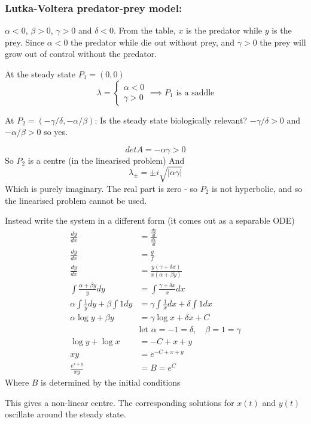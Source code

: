 \documentclass{X:/Documents/Coding/Latex/myassignment}
\begin{document}
\subsubsection{Lutka-Voltera predator-prey model:}
$\alpha <0$, $\beta > 0$, $\gamma > 0$ and $\delta < 0$.
From the table, $x$ is the predator while $y$ is the prey. Since $\alpha <0$ the predator while die out without prey, and $\gamma >0$ the prey will grow out of control without the predator.

At the steady state $P_1 = (0,0)$
\[\lambda = \begin{cases}\alpha < 0\\\gamma > 0\end{cases} \implies P_1 \text{ is a saddle}\]

At $P_2 = (-\gamma/\delta, -\alpha/\beta)$:
Is the steady state biologically relevant? $-\gamma/\delta > 0$ and $-\alpha/\beta >0$ so yes.

\[det A = -\alpha\gamma > 0\]
So $P_2$ is a centre (in the linearised problem)
And
\[\lambda_\pm = \pm i \sqrt{|\alpha \gamma|}\]
Which is purely imaginary. The real part is zero - so $P_2$ is not hyperbolic, and so the linearised problem cannot be used.


Instead write the system in a different form (it comes out as a separable ODE)
\begin{align*}
    \frac{dy}{dx} &= \frac{\frac{dy}{dt}}{\frac{dx}{dt}}\\
    \frac{dy}{dx} &= \frac{g}{f} \\
    \frac{dy}{dx} &= \frac{y(\gamma + \delta x)}{x(\alpha + \beta y)}\\
    \int \frac{\alpha + \beta y}y dy &= \int \frac{\gamma + \delta x}{x} dx\\
    \alpha \int \frac1y dy + \beta \int 1 dy &= \gamma \int \frac1x dx + \delta \int 1 dx\\
    \alpha \log y + \beta y &= \gamma \log x + \delta x + C\\
    &\text{let } \alpha = -1 = \delta,\quad \beta =1 =\gamma\\
    \log y + \log x &= - C + x + y\\
    xy &= e^{-C+x+y}\\
    \frac{e^{x+y}}{xy} &= B = e^{C}
\end{align*}
Where $B$ is determined by the initial conditions



This gives a non-linear centre.
The corresponding solutions for $x(t)$ and $y(t)$ oscillate around the steady state.
\end{document}
